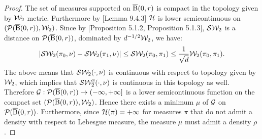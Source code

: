 \begin{proof}
The set of measures supported on $\operatorname{\overline{B}}(0,r)$ is compact in the topology given by ${\cal W}_2$ metric. Furthermore by \cite{ambrosio2008gradient}[Lemma 9.4.3] ${\cal H}$ is lower semicontinuous on $({\cal P}(\operatorname{\overline{B}}(0,r)),{\cal W}_2)$. Since by \cite{bonnotte2013unidimensional}[Proposition 5.1.2, Proposition 5.1.3], ${\cal S}{\cal W}_2$ is a distance  on ${\cal P}(\operatorname{\overline{B}}(0,r))$, dominated by $d^{-1/2} {\cal W}_2$, we have:
\[
|{\cal S}{\cal W}_2(\pi_0, \nu) - {\cal S}{\cal W}_2(\pi_1, \nu)| \leq {\cal S}{\cal W}_2(\pi_0, \pi_1) \leq \frac{1}{\sqrt{d}}{\cal W}_2(\pi_0, \pi_1).
\]
The above means that ${\cal S}{\cal W}_2(\cdot, \nu)$ is continuous with respect to topology given by ${\cal W}_2$, which implies that ${\cal S}{\cal W}_2^2(\cdot, \nu)$ is continuous in this topology as well. Therefore $\mathcal{G} : {\cal P}(\operatorname{\overline{B}}(0,r)) \to \left(-\infty,+\infty\right]$ is a lower semicontinuous function on the compact set $({\cal P}(\operatorname{\overline{B}}(0,r)),{\cal W}_2)$. Hence there exists a minimum  $\mu$ of $\mathcal{G}$ on $\mathcal{P}(\operatorname{\overline{B}}(0,r))$. Furthermore, since $\mathcal{H}(\pi) = +\infty$  for measures $\pi$ that do not admit a density with respect to Lebesgue measure, the measure $\mu$ must admit a density $\rho$.


\end{proof}
